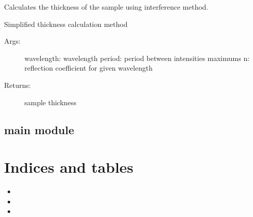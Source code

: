 \documentclass[letterpaper,10pt,english]{sphinxmanual}
\begin{document}

\begin{fulllineitems}
\label{\detokenize{GUI:GUI.thickness}}
Calculates the thickness of the sample using interference method.

Simplified thickness calculation method
\begin{description}
\item[{Args:}] \leavevmode
wavelength: wavelength
period: period between intensities maximums
n: reflection coefficient for given wavelength

\item[{Returns:}] \leavevmode
sample thickness

\end{description}

\end{fulllineitems}



\section{main module}
\label{\detokenize{main:module-main}}\label{\detokenize{main:main-module}}\label{\detokenize{main::doc}}

\chapter{Indices and tables}
\label{\detokenize{index:indices-and-tables}}\begin{itemize}
\item {} 

\item {} 

\item {} 

\end{itemize}


\renewcommand{\indexname}{Python Module Index}
\begin{sphinxtheindex}
\let\bigletter\sphinxstyleindexlettergroup
\bigletter{g}
\item\relax{}
\indexspace
\bigletter{m}
\item\relax{}
\end{sphinxtheindex}

\renewcommand{\indexname}{Index}
\printindex
\end{document}
